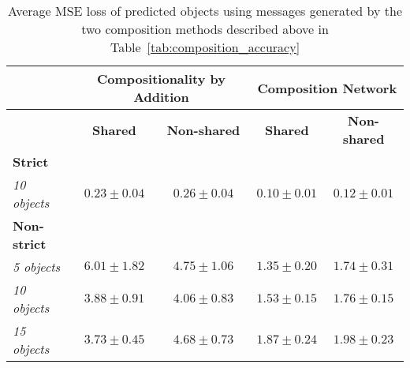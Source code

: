 \documentclass[11pt,a4paper]{article}
\begin{document}
\begin{table}[hbt!]
\begin{tabular}{lcccc}
\toprule
                       & \multicolumn{2}{c}{\textbf{Compositionality by Addition}} & \multicolumn{2}{c}{\textbf{Composition Network}} \\ \midrule
                       & \textbf{Shared} & \textbf{Non-shared} & \textbf{Shared} & \textbf{Non-shared} \\ \midrule
\textbf{Strict} & \\ 
\emph{10 objects} &  $0.23\pm 0.04$  & $0.26\pm 0.04$ &  $0.10\pm 0.01$  & $0.12\pm 0.01$      \\ %
\textbf{Non-strict} & \\
\emph{5 objects} &
	$6.01\pm 1.82$  & $4.75\pm 1.06$ &  $1.35\pm 0.20$  & $1.74\pm 0.31$      \\
\emph{10 objects} &
	$3.88\pm 0.91$  & $4.06\pm 0.83$ &  $1.53\pm 0.15$  & $1.76\pm 0.15$     \\
\emph{15 objects} &
	$3.73\pm 0.45$  & $4.68\pm 0.73$ &  $1.87\pm 0.24$  & $1.98\pm 0.23$     \\ \bottomrule
\end{tabular}
\caption{Average MSE loss of predicted objects using messages generated by the two composition methods described above in Table~\ref{tab:composition_accuracy}}\label{tab:composition_mse_losses}
\end{table}
\end{document}
